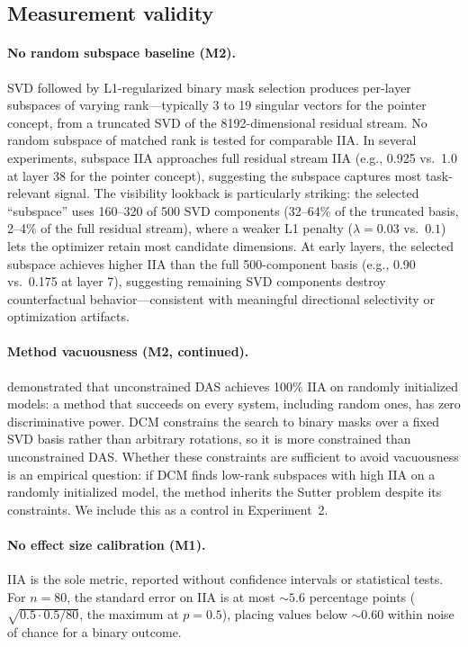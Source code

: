 \documentclass{article}
\begin{document}
\subsection{Measurement validity}

\paragraph{No random subspace baseline (M2).}
SVD followed by L1-regularized binary mask selection produces per-layer subspaces of varying rank---typically 3 to 19 singular vectors for the pointer concept, from a truncated SVD of the 8192-dimensional residual stream. No random subspace of matched rank is tested for comparable IIA. In several experiments, subspace IIA approaches full residual stream IIA (e.g., 0.925 vs.\ 1.0 at layer 38 for the pointer concept), suggesting the subspace captures most task-relevant signal. The visibility lookback is particularly striking: the selected ``subspace'' uses 160--320 of 500 SVD components (32--64\% of the truncated basis, 2--4\% of the full residual stream), where a weaker L1 penalty ($\lambda = 0.03$ vs.\ $0.1$) lets the optimizer retain most candidate dimensions. At early layers, the selected subspace achieves higher IIA than the full 500-component basis (e.g., 0.90 vs.\ 0.175 at layer 7), suggesting remaining SVD components destroy counterfactual behavior---consistent with meaningful directional selectivity or optimization artifacts.

\paragraph{Method vacuousness (M2, continued).}
\citet{sutter2025vacuous} demonstrated that unconstrained DAS achieves 100\% IIA on randomly initialized models: a method that succeeds on every system, including random ones, has zero discriminative power. DCM constrains the search to binary masks over a fixed SVD basis rather than arbitrary rotations, so it is more constrained than unconstrained DAS. Whether these constraints are sufficient to avoid vacuousness is an empirical question: if DCM finds low-rank subspaces with high IIA on a randomly initialized model, the method inherits the Sutter problem despite its constraints. We include this as a control in Experiment~2.

\paragraph{No effect size calibration (M1).}
IIA is the sole metric, reported without confidence intervals or statistical tests. For $n = 80$, the standard error on IIA is at most ${\sim}5.6$ percentage points ($\sqrt{0.5 \cdot 0.5 / 80}$, the maximum at $p = 0.5$), placing values below ${\sim}0.60$ within noise of chance for a binary outcome.
\end{document}
